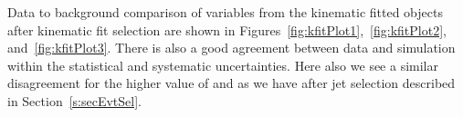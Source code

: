 
Data to background comparison of variables from the kinematic fitted objects after kinematic 
fit selection are shown in Figures~\ref{fig:kfitPlot1},~\ref{fig:kfitPlot2}, and~\ref{fig:kfitPlot3}. 
There is also a good agreement between data and simulation within the statistical and systematic 
uncertainties. Here also we see a similar disagreement for the higher value of \pt and \MET as
we have after \PQb jet selection described in Section~\ref{s:secEvtSel}.

\begin{figure}
    \centering  
    \vfil

\end{figure}
